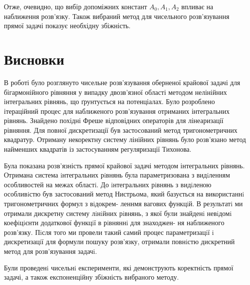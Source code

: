 \documentclass[12pt]{report}
\begin{document}
Отже, очевидно, що вибір допоміжних констант $A_0,A_1,A_2$ впливає на наближення розв'язку. Також вибраний метод для чисельного розв'язування прямої задачі показує необхідну збіжність.

\chapter*{Висновки}

\quad В роботі було розглянуто чисельне розв'язування оберненої крайової задачі для бігармонійного рівняння у випадку двозв'язної області методом нелінійних інтегральних рівнянь, що ґрунтується на потенціалах. Було розроблено ітераційний процес для наближеного розв'язування отриманих інтегральних рівнянь. Знайдено похідні Фреше відповідних операторів для лінеаризації рівняння. Для повної дискретизації був застосований метод тригонометричних квадратур. Отриману некоректну систему лінійних рівнянь було розв'язано метод найменших квадратів із застосуванням регуляризації Тихонова.

Була показана розв'язність прямої крайової задачі методом інтегральних рівнянь. Отримана система iнтегральних рiвнянь була параметризована з видiленням особливостей на межах областi. До iнтегральних рiвнянь з видiленою особливiстю був застосований метод Нистрьома, який базується на використаннi тригонометричних формул з вiдокрем- леннмя вагових функцiй. В результатi ми отримали дискретну систему лiнiйних рiвнянь, з якої були знайденi невiдомi коефiцiєнти додаткової функцiї в рiвняннi для знаходжен- ня наближеного розв’язку. Пiсля того ми провели такий самий процес параметризацiї i дискретизацiї для формули пошуку розв’язку, отримали повнiстю дискретний метод для розв’язування задачi.

Були проведенi чисельнi експерименти, які демонструють коректність прямої задачі, а також експоненційну збіжність вибраного методу.
\end{document}
